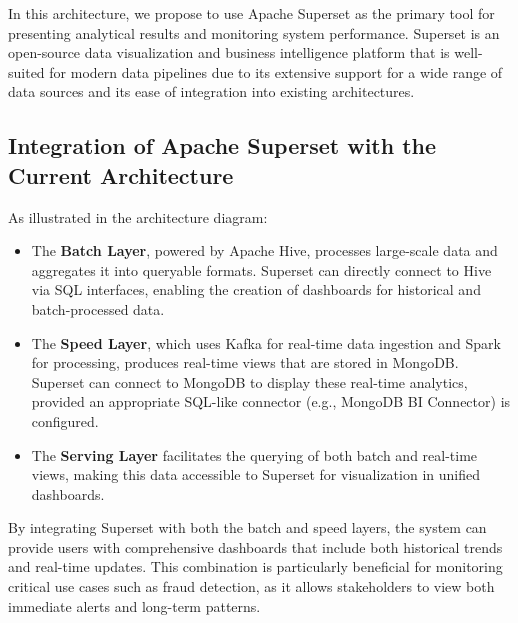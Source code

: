 \documentclass[12pt,a4paper, hidelinks]{article}
\begin{document}
In this architecture, we propose to use Apache Superset as the primary tool for presenting analytical results and monitoring system performance. Superset is an open-source data visualization and business intelligence platform that is well-suited for modern data pipelines due to its extensive support for a wide range of data sources and its ease of integration into existing architectures.

\subsection{Integration of Apache Superset with the Current Architecture}
As illustrated in the architecture diagram:
\begin{itemize}
    \item The \textbf{Batch Layer}, powered by Apache Hive, processes large-scale data and aggregates it into queryable formats. Superset can directly connect to Hive via SQL interfaces, enabling the creation of dashboards for historical and batch-processed data.
    \item The \textbf{Speed Layer}, which uses Kafka for real-time data ingestion and Spark for processing, produces real-time views that are stored in MongoDB. Superset can connect to MongoDB to display these real-time analytics, provided an appropriate SQL-like connector (e.g., MongoDB BI Connector) is configured.
    \item The \textbf{Serving Layer} facilitates the querying of both batch and real-time views, making this data accessible to Superset for visualization in unified dashboards.
\end{itemize}

By integrating Superset with both the batch and speed layers, the system can provide users with comprehensive dashboards that include both historical trends and real-time updates. This combination is particularly beneficial for monitoring critical use cases such as fraud detection, as it allows stakeholders to view both immediate alerts and long-term patterns.
\end{document}

